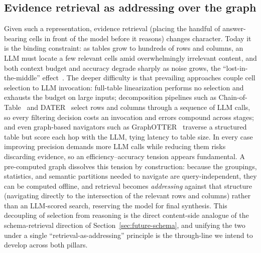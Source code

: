 \subsection{Evidence retrieval as addressing over the graph}
\label{sec:future-evidence}
Given such a representation, evidence retrieval (placing the handful of answer-bearing cells in front of the model before it reasons) changes character. Today it is the binding constraint: as tables grow to hundreds of rows and columns, an LLM must locate a few relevant cells amid overwhelmingly irrelevant content, and both context budget and accuracy degrade sharply as noise grows, the ``lost-in-the-middle'' effect~\cite{liu2024lostmiddle}. The deeper difficulty is that prevailing approaches couple cell selection to LLM invocation: full-table linearization performs no selection and exhausts the budget on large inputs; decomposition pipelines such as Chain-of-Table~\cite{wang2024chaintable} and DATER~\cite{ye2023dater} select rows and columns through a sequence of LLM calls, so every filtering decision costs an invocation and errors compound across stages; and even graph-based navigators such as GraphOTTER~\cite{li2025graphotter} traverse a structured table but score each hop with the LLM, tying latency to table size. In every case improving precision demands more LLM calls while reducing them risks discarding evidence, so an efficiency--accuracy tension appears fundamental. A pre-computed graph dissolves this tension by construction: because the groupings, statistics, and semantic partitions needed to navigate are query-independent, they can be computed offline, and retrieval becomes \emph{addressing} against that structure (navigating directly to the intersection of the relevant rows and columns) rather than an LLM-scored search, reserving the model for final synthesis. This decoupling of selection from reasoning is the direct content-side analogue of the schema-retrieval direction of Section~\ref{sec:future-schema}, and unifying the two under a single ``retrieval-as-addressing'' principle is the through-line we intend to develop across both pillars.

